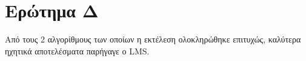 \section{Ερώτημα Δ}
Από τους 2 αλγορίθμους των οποίων η εκτέλεση ολοκληρώθηκε επιτυχώς, καλύτερα ηχητικά αποτελέσματα παρήγαγε ο LMS.
